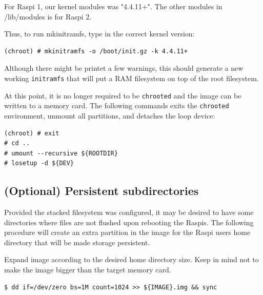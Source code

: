 For \ac{Raspi} 1, our kernel modules was "4.4.11+". The other modules in /lib/modules
is for \ac{Raspi} 2.

Thus, to run mkinitramfs, type in the correct kernel version:

\begin{lstlisting}[]
(chroot) # mkinitramfs -o /boot/init.gz -k 4.4.11+
\end{lstlisting}
\FloatBarrier
\vspace{-5mm}

Although there might be printet a few warnings, this should generate
a new working \texttt{initramfs} that will put a \ac{RAM} filesystem
on top of the root filesystem.

At this point, it is no longer required to be \texttt{chrooted} and the image
can be written to a memory card. The following commands exits the \texttt{chrooted}
environment, unmount all partitions, and detaches the loop device:

\begin{lstlisting}[]
(chroot) # exit
# cd ..
# umount --recursive ${ROOTDIR}
# losetup -d ${DEV}
\end{lstlisting}
\FloatBarrier
\vspace{-5mm}

\subsection{(Optional) Persistent subdirectories}

Provided the stacked filesystem was configured, it may be desired to have
some directories where files are not flushed upon rebooting the \ac{Raspi}s.
The following procedure will create an extra partition in the image for
the \ac{Raspi} users home directory that will be made storage persistent.

Expand image according to the desired home directory size. Keep in mind not
to make the image bigger than the target memory card.
\begin{lstlisting}[]
$ dd if=/dev/zero bs=1M count=1024 >> ${IMAGE}.img && sync
\end{lstlisting}
\FloatBarrier
\vspace{-5mm}

